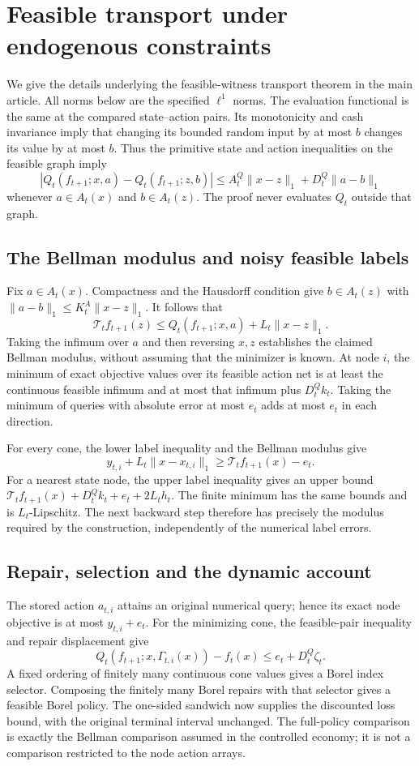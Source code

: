 \section{Feasible transport under endogenous constraints}\label{app:feasible46}
We give the details underlying the feasible-witness transport theorem in the main article. All norms below are the specified $\ell^1$ norms. The evaluation functional is the same at the compared state--action pairs. Its monotonicity and cash invariance imply that changing its bounded random input by at most $b$ changes its value by at most $b$. Thus the primitive state and action inequalities on the feasible graph imply
\[
 |Q_t(f_{t+1};x,a)-Q_t(f_{t+1};z,b)|
 \le A_t^Q\|x-z\|_1+D_t^Q\|a-b\|_1
\]
whenever $a\in A_t(x)$ and $b\in A_t(z)$. The proof never evaluates $Q_t$ outside that graph.

\subsection{The Bellman modulus and noisy feasible labels}
Fix $a\in A_t(x)$. Compactness and the Hausdorff condition give $b\in A_t(z)$ with $\|a-b\|_1\le K_t^A\|x-z\|_1$. It follows that
\[
 \mathcal T_tf_{t+1}(z)
 \le Q_t(f_{t+1};x,a)+L_t\|x-z\|_1.
\]
Taking the infimum over $a$ and then reversing $x,z$ establishes the claimed Bellman modulus, without assuming that the minimizer is known. At node $i$, the minimum of exact objective values over its feasible action net is at least the continuous feasible infimum and at most that infimum plus $D_t^Qk_t$. Taking the minimum of queries with absolute error at most $e_t$ adds at most $e_t$ in each direction.

For every cone, the lower label inequality and the Bellman modulus give
\[
 y_{t,i}+L_t\|x-x_{t,i}\|_1\ge\mathcal T_tf_{t+1}(x)-e_t.
\]
For a nearest state node, the upper label inequality gives an upper bound $\mathcal T_tf_{t+1}(x)+D_t^Qk_t+e_t+2L_th_t$. The finite minimum has the same bounds and is $L_t$-Lipschitz. The next backward step therefore has precisely the modulus required by the construction, independently of the numerical label errors.

\subsection{Repair, selection and the dynamic account}
The stored action $a_{t,i}$ attains an original numerical query; hence its exact node objective is at most $y_{t,i}+e_t$. For the minimizing cone, the feasible-pair inequality and repair displacement give
\[
 Q_t(f_{t+1};x,\Gamma_{t,i}(x))-f_t(x)
 \le e_t+D_t^Q\zeta_t.
\]
A fixed ordering of finitely many continuous cone values gives a Borel index selector. Composing the finitely many Borel repairs with that selector gives a feasible Borel policy. The one-sided sandwich now supplies the discounted loss bound, with the original terminal interval unchanged. The full-policy comparison is exactly the Bellman comparison assumed in the controlled economy; it is not a comparison restricted to the node action arrays.

